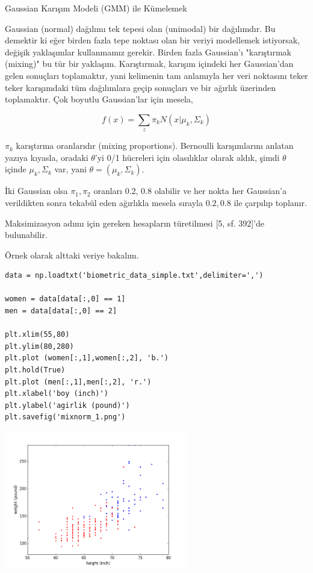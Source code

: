 \documentclass[12pt,fleqn]{article}\usepackage{../../common}
\begin{document}
Gaussian Karışım Modeli (GMM) ile Kümelemek

Gaussian (normal) dağılımı tek tepesi olan (unimodal) bir dağılımdır. Bu
demektir ki eğer birden fazla tepe noktası olan bir veriyi modellemek
istiyorsak, değişik yaklaşımlar kullanmamız gerekir. Birden fazla
Gaussian'ı "karıştırmak (mixing)" bu tür bir yaklaşım. Karıştırmak, karışım
içindeki her Gaussian'dan gelen sonuçları toplamaktır, yani kelimenin tam
anlamıyla her veri noktasını teker teker karışımdaki tüm dağılımlara geçip
sonuçları ve bir ağırlık üzerinden toplamaktır. Çok boyutlu Gaussian'lar
için mesela,

$$ f(x) = \sum_z \pi_k N(x | \mu_k,\Sigma_k) $$

$\pi_k$ karıştırma oranlarıdır (mixing proportions). Bernoulli
karışımlarını anlatan yazıya kıyasla, oradaki $\theta$'yi 0/1 hücreleri
için olasılıklar olarak aldık, şimdi $\theta$ içinde $\mu_k,\Sigma_k$ var,
yani $\theta=(\mu_k,\Sigma_k)$. 

İki Gaussian olsa $\pi_1,\pi_2$ oranları 0.2, 0.8 olabilir ve her
nokta her Gaussian'a verildikten sonra tekabül eden ağırlıkla mesela
sırayla $0.2,0.8$ ile çarpılıp toplanır. 

Maksimizasyon adımı için gereken hesapların türetilmesi [5, sf. 392]'de
bulunabilir.

Örnek olarak alttaki veriye bakalım.

\begin{verbatim}
data = np.loadtxt('biometric_data_simple.txt',delimiter=',')

women = data[data[:,0] == 1]
men = data[data[:,0] == 2]

plt.xlim(55,80)
plt.ylim(80,280)
plt.plot (women[:,1],women[:,2], 'b.')
plt.hold(True)
plt.plot (men[:,1],men[:,2], 'r.')
plt.xlabel('boy (inch)')
plt.ylabel('agirlik (pound)')
plt.savefig('mixnorm_1.png')
\end{verbatim}

\includegraphics[height=6cm]{mixnorm_1.png}
\end{document}
